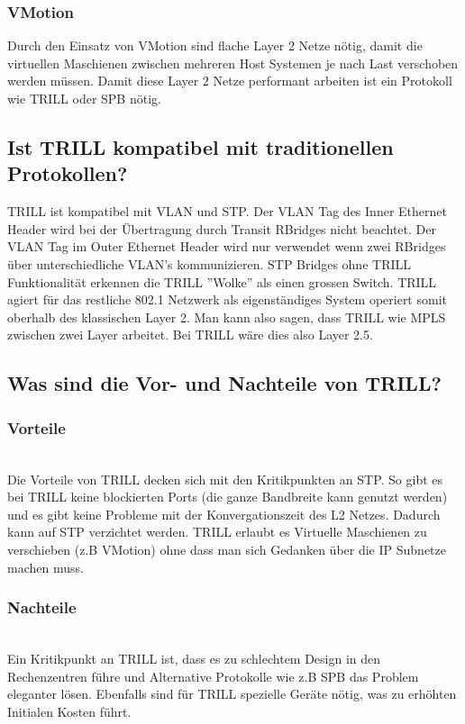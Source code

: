 \subsubsection{VMotion}
Durch den Einsatz von VMotion sind flache Layer 2 Netze nötig, damit die virtuellen Maschienen zwischen mehreren Host Systemen je nach Last verschoben werden müssen. Damit diese Layer 2 Netze performant arbeiten ist ein Protokoll wie TRILL oder SPB nötig. 


\subsection{Ist TRILL kompatibel mit traditionellen Protokollen?} %
TRILL ist kompatibel mit VLAN und STP. Der VLAN Tag des Inner Ethernet Header wird bei der Übertragung durch Transit RBridges nicht beachtet. Der VLAN Tag im Outer Ethernet Header wird nur verwendet wenn zwei RBridges über unterschiedliche VLAN's kommunizieren. STP Bridges ohne TRILL Funktionalität erkennen die TRILL ''Wolke'' als einen grossen Switch. TRILL agiert für das restliche 802.1 Netzwerk als eigenständiges System operiert somit oberhalb des klassischen Layer 2. Man kann also sagen, dass TRILL wie MPLS zwischen zwei Layer arbeitet. Bei TRILL wäre dies also Layer 2.5. 


\subsection{Was sind die Vor- und Nachteile von TRILL?}%
\subsubsection{Vorteile} \hfill \\
Die Vorteile von TRILL decken sich mit den Kritikpunkten an STP. So gibt es bei TRILL keine blockierten Ports (die ganze Bandbreite kann genutzt werden) und es gibt keine Probleme mit der Konvergationszeit des L2 Netzes. Dadurch kann auf STP verzichtet werden. 
TRILL erlaubt es Virtuelle Maschienen zu verschieben (z.B VMotion) ohne dass man sich Gedanken über die IP Subnetze machen muss.

\subsubsection{Nachteile} \hfill \\
Ein Kritikpunkt an TRILL ist, dass es zu schlechtem Design in den Rechenzentren führe und Alternative Protokolle wie z.B SPB das Problem eleganter lösen. Ebenfalls sind für TRILL spezielle Geräte nötig, was zu erhöhten Initialen Kosten führt.

